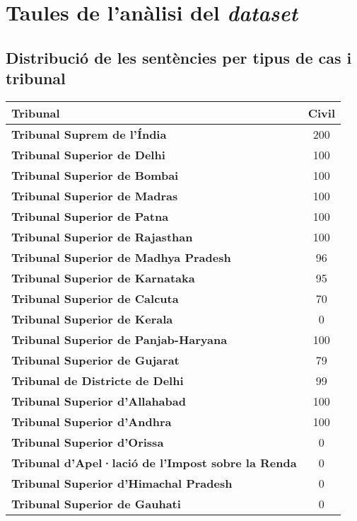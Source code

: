\chapter{Taules de l'anàlisi del \textit{dataset}}

\section{Distribució de les sentències per tipus de cas i tribunal}
\pagebreak

\begin{table}[H]
    \centering
    \begin{tabular}{|l|c}
        \Xhline{2\arrayrulewidth}
        \textbf{Tribunal} & \textbf{Civil} \\
        \hline
        \textbf{Tribunal Suprem de l'Índia} & 200 \\
        \textbf{Tribunal Superior de Delhi} & 100 \\
        \textbf{Tribunal Superior de Bombai} & 100 \\
        \textbf{Tribunal Superior de Madras} & 100 \\
        \textbf{Tribunal Superior de Patna} & 100 \\
        \textbf{Tribunal Superior de Rajasthan} & 100 \\
        \textbf{Tribunal Superior de Madhya Pradesh} & 96 \\
        \textbf{Tribunal Superior de Karnataka} & 95 \\
        \textbf{Tribunal Superior de Calcuta} & 70 \\
        \textbf{Tribunal Superior de Kerala} & 0 \\
        \textbf{Tribunal Superior de Panjab-Haryana} & 100 \\
        \textbf{Tribunal Superior de Gujarat} & 79 \\
        \textbf{Tribunal de Districte de Delhi} & 99 \\
        \textbf{Tribunal Superior d'Allahabad} & 100 \\
        \textbf{Tribunal Superior d'Andhra} & 100 \\
        \textbf{Tribunal Superior d'Orissa} & 0 \\
        \textbf{Tribunal d'Apel·lació de l'Impost sobre la Renda} & 0 \\
        \textbf{Tribunal Superior d'Himachal Pradesh} & 0 \\
        \textbf{Tribunal Superior de Gauhati} & 0 \\

\end{tabular}
\end{table}
